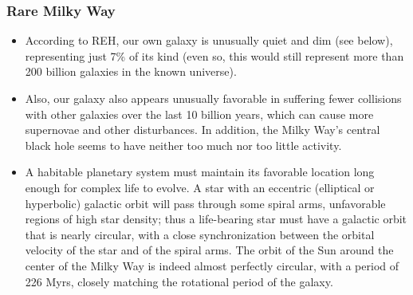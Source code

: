 \begin{frame}
\frametitle{Rare Milky Way}

\begin{itemize}
\item According to REH, our own galaxy is unusually quiet and dim (see below), representing just 7\% of its kind (even so, this would still represent more than 200 billion galaxies in the known universe).

\item Also, our galaxy also appears unusually favorable in suffering fewer collisions with other galaxies over the last 10 billion years, which can cause more supernovae and other disturbances. In addition, the Milky Way's central black hole seems to have neither too much nor too little activity.

\item A habitable planetary system must maintain its favorable location long enough for complex life to evolve. A star with an eccentric (elliptical or hyperbolic) galactic orbit will pass through some spiral arms, unfavorable regions of high star density; thus a life-bearing star must have a galactic orbit that is nearly circular, with a close synchronization between the orbital velocity of the star and of the spiral arms. The orbit of the Sun around the center of the Milky Way is indeed almost perfectly circular, with a period of 226 Myrs, closely matching the rotational period of the galaxy. 

\end{itemize}
\end{frame}

